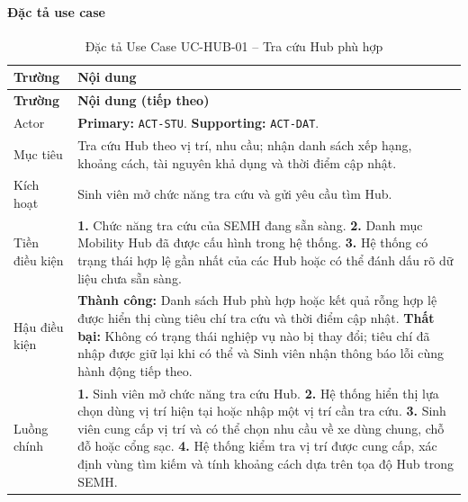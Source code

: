 \paragraph{Đặc tả use case}
\small
\begin{longtable}{|L{26mm}|L{118mm}|}
  \caption{Đặc tả Use Case UC-HUB-01 -- Tra cứu Hub phù hợp}\label{tab:spec-UC-HUB-01}\\
  \hline
  \centering\arraybackslash\textbf{Trường} & \centering\arraybackslash\textbf{Nội dung}\\
  \hline
  \endfirsthead
  \hline
  \centering\arraybackslash\textbf{Trường} & \centering\arraybackslash\textbf{Nội dung (tiếp theo)}\\
  \hline
  \endhead
  Actor & \textbf{Primary:} \texttt{ACT-STU}. \textbf{Supporting:} \texttt{ACT-DAT}.\\\hline
  Mục tiêu & Tra cứu Hub theo vị trí, nhu cầu; nhận danh sách xếp hạng, khoảng cách, tài nguyên khả dụng và thời điểm cập nhật.\\\hline
  Kích hoạt & Sinh viên mở chức năng tra cứu và gửi yêu cầu tìm Hub.\\\hline
  Tiền điều kiện &
    \textbf{1.} Chức năng tra cứu của SEMH đang sẵn sàng.\newline
    \textbf{2.} Danh mục Mobility Hub đã được cấu hình trong hệ thống.\newline
    \textbf{3.} Hệ thống có trạng thái hợp lệ gần nhất của các Hub hoặc có thể đánh dấu rõ dữ liệu chưa sẵn sàng.\\\hline
  Hậu điều kiện &
    \textbf{Thành công:} Danh sách Hub phù hợp hoặc kết quả rỗng hợp lệ được hiển thị cùng tiêu chí tra cứu và thời điểm cập nhật.\newline
    \textbf{Thất bại:} Không có trạng thái nghiệp vụ nào bị thay đổi; tiêu chí đã nhập được giữ lại khi có thể và Sinh viên nhận thông báo lỗi cùng hành động tiếp theo.\\\hline
  Luồng chính &
    \textbf{1.} Sinh viên mở chức năng tra cứu Hub.\newline
    \textbf{2.} Hệ thống hiển thị lựa chọn dùng vị trí hiện tại hoặc nhập một vị trí cần tra cứu.\newline
    \textbf{3.} Sinh viên cung cấp vị trí và có thể chọn nhu cầu về xe dùng chung, chỗ đỗ hoặc cổng sạc.\newline
    \textbf{4.} Hệ thống kiểm tra vị trí được cung cấp, xác định vùng tìm kiếm và tính khoảng cách dựa trên tọa độ Hub trong SEMH.\newline

\end{longtable}
